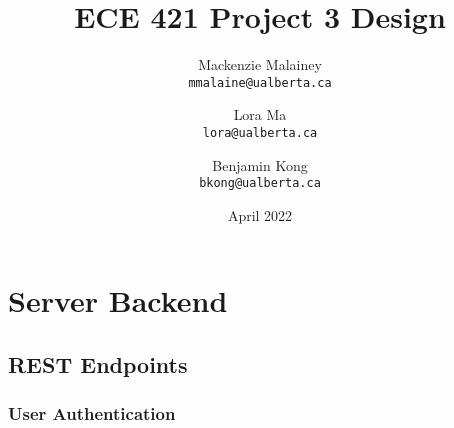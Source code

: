 \documentclass{article}
\title{ECE 421 Project 3 Design}
\author{
  Mackenzie Malainey\\
  \texttt{mmalaine@ualberta.ca}
  \and
  Lora Ma\\
  \texttt{lora@ualberta.ca}
  \and
  Benjamin Kong\\
  \texttt{bkong@ualberta.ca}
}
\date{April 2022}
\begin{document}
\begin{titlepage}
    \maketitle
    \tableofcontents
\end{titlepage}

\section{Server Backend}

\subsection{REST Endpoints}

\subsubsection{User Authentication}
\end{document}
